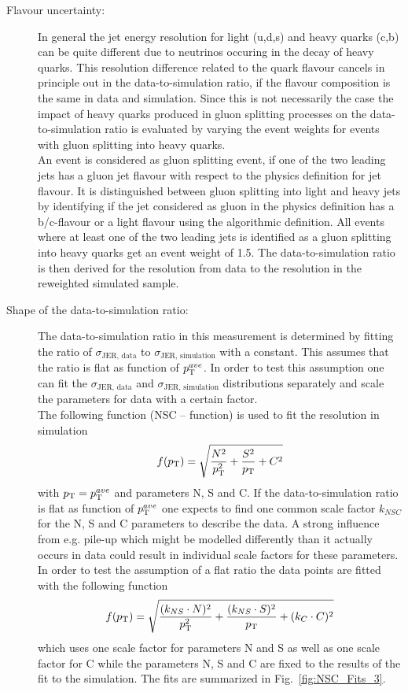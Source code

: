\begin{description}
\item[Flavour uncertainty:] In general the jet energy resolution for light (u,d,s) and heavy quarks (c,b) can be quite different due to neutrinos occuring in the decay of heavy quarks. This resolution difference related to the quark flavour cancels in principle out in the data-to-simulation ratio, if the flavour composition is the same in data and simulation. Since this is not necessarily the case the impact of heavy quarks produced in gluon splitting processes on the data-to-simulation ratio is evaluated by varying the event weights for events with gluon splitting into heavy quarks.\\
An event is considered as gluon splitting event, if one of the two leading jets has a gluon jet flavour with respect to the physics definition for jet flavour. It is distinguished between gluon splitting into light and heavy jets by identifying if the jet considered as gluon in the physics definition has a b/c-flavour or a light flavour using the algorithmic definition. All events where at least one of the two leading jets is identified as a gluon splitting into heavy quarks get an event weight of 1.5. The data-to-simulation ratio is then derived for the resolution from data to the resolution in the reweighted simulated sample.

\item[Shape of the data-to-simulation ratio:] The data-to-simulation ratio in this measurement is determined by fitting the ratio of $\sigma_\mathrm{JER,\, data}$ to $\sigma_\mathrm{JER,\, simulation}$ with a constant. This assumes that the ratio is flat as function of $p_{\text{T}}^{ave}$. In order to test this assumption one can fit the $\sigma_\mathrm{JER,\, data}$ and $\sigma_\mathrm{JER,\, simulation}$ distributions separately and scale the parameters for data with a certain factor. \\ 
The following function (NSC -- function) is used to fit the resolution in simulation
\begin{equation}
f(p_{\text{T}}) = \sqrt{\frac{N^2}{p_{\text{T}}^{2}} + \frac{S^2}{p_{\text{T}}} + C^2}
\end{equation}
with $p_{\text{T}}=p_{\text{T}}^{ave}$ and parameters N, S and C. If the data-to-simulation ratio is flat as function of $p_{\text{T}}^{ave}$ one expects to find one common scale factor $k_{NSC}$ for the N, S and C parameters to describe the data. A strong influence from e.g. pile-up which might be modelled differently than it actually occurs in data could result in individual scale factors for these parameters. \\
In order to test the assumption of a flat ratio the data points are fitted with the following function 
\begin{equation}
f(p_{\text{T}}) = \sqrt{\frac{(k_{NS} \cdot N)^2}{p_{\text{T}}^{2}} + \frac{(k_{NS} \cdot S)^2}{p_{\text{T}}} + (k_{C} \cdot C)^2} 
\end{equation} 
which uses one scale factor for parameters N and S as well as one scale factor for C while the parameters N, S and C are fixed to the results of the fit to the simulation. The fits are summarized in Fig.~\ref{fig:NSC_Fits_3}.


\end{description}
